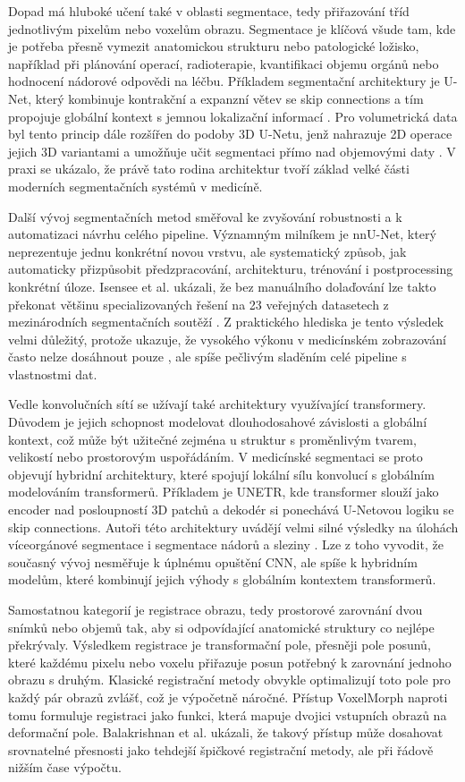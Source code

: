 \documentclass[male,czech,api_bc]{kitheses}
\begin{document}
Dopad má hluboké učení také v oblasti segmentace, tedy přiřazování tříd jednotlivým pixelům nebo voxelům obrazu. Segmentace je klíčová všude tam, kde je potřeba přesně vymezit anatomickou strukturu nebo patologické ložisko, například při plánování operací, radioterapie, kvantifikaci objemu orgánů nebo hodnocení nádorové odpovědi na léčbu. Příkladem segmentační architektury je U-Net, který kombinuje kontrakční a expanzní větev se skip connections a tím propojuje globální kontext s jemnou lokalizační informací \cite{Ronneberger2015}. Pro volumetrická data byl tento princip dále rozšířen do podoby 3D U-Netu, jenž nahrazuje 2D operace jejich 3D variantami a umožňuje učit segmentaci přímo nad objemovými daty \cite{Cicek2016}. V praxi se ukázalo, že právě tato rodina architektur tvoří základ velké části moderních segmentačních systémů v medicíně.

Další vývoj segmentačních metod směřoval ke zvyšování robustnosti a k automatizaci návrhu celého pipeline. Významným milníkem je nnU-Net, který neprezentuje jednu konkrétní novou vrstvu, ale systematický způsob, jak automaticky přizpůsobit předzpracování, architekturu, trénování i postprocessing konkrétní úloze. Isensee et al. ukázali, že bez manuálního dolaďování lze takto překonat většinu specializovaných řešení na 23 veřejných datasetech z mezinárodních segmentačních soutěží \cite{Isensee2021nnUNet}. Z praktického hlediska je tento výsledek velmi důležitý, protože ukazuje, že vysokého výkonu v medicínském zobrazování často nelze dosáhnout pouze , ale spíše pečlivým sladěním celé pipeline s vlastnostmi dat.

Vedle konvolučních sítí se užívají také architektury využívající transformery. Důvodem je jejich schopnost modelovat dlouhodosahové závislosti a globální kontext, což může být užitečné zejména u struktur s proměnlivým tvarem, velikostí nebo prostorovým uspořádáním. V medicínské segmentaci se proto objevují hybridní architektury, které spojují lokální sílu konvolucí s globálním modelováním transformerů. Příkladem je UNETR, kde transformer slouží jako encoder nad posloupností 3D patchů a dekodér si ponechává U-Netovou logiku se skip connections. Autoři této architektury uvádějí velmi silné výsledky na úlohách víceorgánové segmentace i segmentace nádorů a sleziny \cite{Hatamizadeh2022UNETR}. Lze z toho vyvodit, že současný vývoj nesměřuje k úplnému opuštění CNN, ale spíše k hybridním modelům, které kombinují jejich výhody s globálním kontextem transformerů.

Samostatnou kategorií je registrace obrazu, tedy prostorové zarovnání dvou snímků nebo objemů tak, aby si odpovídající anatomické struktury co nejlépe překrývaly. Výsledkem registrace je transformační pole, přesněji pole posunů, které každému pixelu nebo voxelu přiřazuje posun potřebný k zarovnání jednoho obrazu s druhým. Klasické registrační metody obvykle optimalizují toto pole pro každý pár obrazů zvlášť, což je výpočetně náročné. Přístup VoxelMorph naproti tomu formuluje registraci jako funkci, která mapuje dvojici vstupních obrazů na deformační pole. Balakrishnan et al. ukázali, že takový přístup může dosahovat srovnatelné přesnosti jako tehdejší špičkové registrační metody, ale při řádově nižším čase výpočtu.\cite{Balakrishnan2019VoxelMorph}
\end{document}
